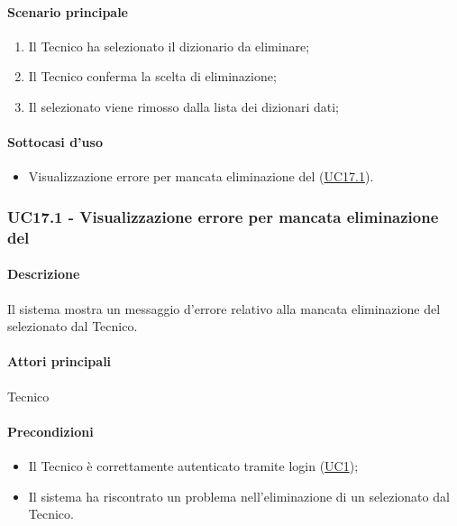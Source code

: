 \paragraph*{Scenario principale}
\begin{enumerate}
  \item Il Tecnico ha selezionato il dizionario da eliminare;
  \item Il Tecnico conferma la scelta di eliminazione;
  \item Il  selezionato viene rimosso dalla lista dei dizionari dati;  
\end{enumerate}

\paragraph*{Sottocasi d'uso}
\begin{itemize}
  \item Visualizzazione errore per mancata eliminazione del  (\hyperref[UC17point1]{UC17.1}).
\end{itemize}


\subsubsection{UC17.1 - Visualizzazione errore per mancata eliminazione del }\label{UC17point1}
\paragraph*{Descrizione} Il sistema mostra un messaggio d’errore relativo alla mancata eliminazione del  selezionato dal Tecnico.

\paragraph*{Attori principali} Tecnico
\paragraph*{Precondizioni}
\begin{itemize}
  \item Il Tecnico è correttamente autenticato tramite login (\hyperref[UC1]{UC1});
  \item Il sistema ha riscontrato un problema nell'eliminazione di un  selezionato dal Tecnico.
\end{itemize}
